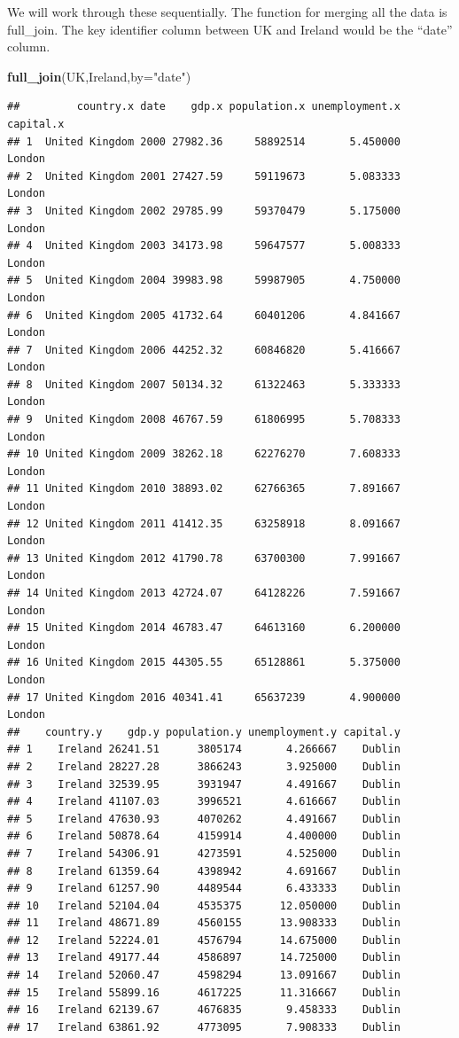 \documentclass[]{book}
\newenvironment{Shaded}{\begin{snugshade}}{\end{snugshade}}
\newcommand{\DataTypeTok}[1]{\textcolor[rgb]{0.13,0.29,0.53}{#1}}
\newcommand{\KeywordTok}[1]{\textcolor[rgb]{0.13,0.29,0.53}{\textbf{#1}}}
\newcommand{\NormalTok}[1]{#1}
\newcommand{\StringTok}[1]{\textcolor[rgb]{0.31,0.60,0.02}{#1}}
\begin{document}
We will work through these sequentially. The function for merging all the data is full\_join. The key identifier column between UK and Ireland would be the ``date'' column.

\begin{Shaded}
\begin{Highlighting}[]
\KeywordTok{full_join}\NormalTok{(UK,Ireland,}\DataTypeTok{by=}\StringTok{"date"}\NormalTok{)}
\end{Highlighting}
\end{Shaded}

\begin{verbatim}
##         country.x date    gdp.x population.x unemployment.x capital.x
## 1  United Kingdom 2000 27982.36     58892514       5.450000    London
## 2  United Kingdom 2001 27427.59     59119673       5.083333    London
## 3  United Kingdom 2002 29785.99     59370479       5.175000    London
## 4  United Kingdom 2003 34173.98     59647577       5.008333    London
## 5  United Kingdom 2004 39983.98     59987905       4.750000    London
## 6  United Kingdom 2005 41732.64     60401206       4.841667    London
## 7  United Kingdom 2006 44252.32     60846820       5.416667    London
## 8  United Kingdom 2007 50134.32     61322463       5.333333    London
## 9  United Kingdom 2008 46767.59     61806995       5.708333    London
## 10 United Kingdom 2009 38262.18     62276270       7.608333    London
## 11 United Kingdom 2010 38893.02     62766365       7.891667    London
## 12 United Kingdom 2011 41412.35     63258918       8.091667    London
## 13 United Kingdom 2012 41790.78     63700300       7.991667    London
## 14 United Kingdom 2013 42724.07     64128226       7.591667    London
## 15 United Kingdom 2014 46783.47     64613160       6.200000    London
## 16 United Kingdom 2015 44305.55     65128861       5.375000    London
## 17 United Kingdom 2016 40341.41     65637239       4.900000    London
##    country.y    gdp.y population.y unemployment.y capital.y
## 1    Ireland 26241.51      3805174       4.266667    Dublin
## 2    Ireland 28227.28      3866243       3.925000    Dublin
## 3    Ireland 32539.95      3931947       4.491667    Dublin
## 4    Ireland 41107.03      3996521       4.616667    Dublin
## 5    Ireland 47630.93      4070262       4.491667    Dublin
## 6    Ireland 50878.64      4159914       4.400000    Dublin
## 7    Ireland 54306.91      4273591       4.525000    Dublin
## 8    Ireland 61359.64      4398942       4.691667    Dublin
## 9    Ireland 61257.90      4489544       6.433333    Dublin
## 10   Ireland 52104.04      4535375      12.050000    Dublin
## 11   Ireland 48671.89      4560155      13.908333    Dublin
## 12   Ireland 52224.01      4576794      14.675000    Dublin
## 13   Ireland 49177.44      4586897      14.725000    Dublin
## 14   Ireland 52060.47      4598294      13.091667    Dublin
## 15   Ireland 55899.16      4617225      11.316667    Dublin
## 16   Ireland 62139.67      4676835       9.458333    Dublin
## 17   Ireland 63861.92      4773095       7.908333    Dublin
\end{verbatim}
\end{document}
